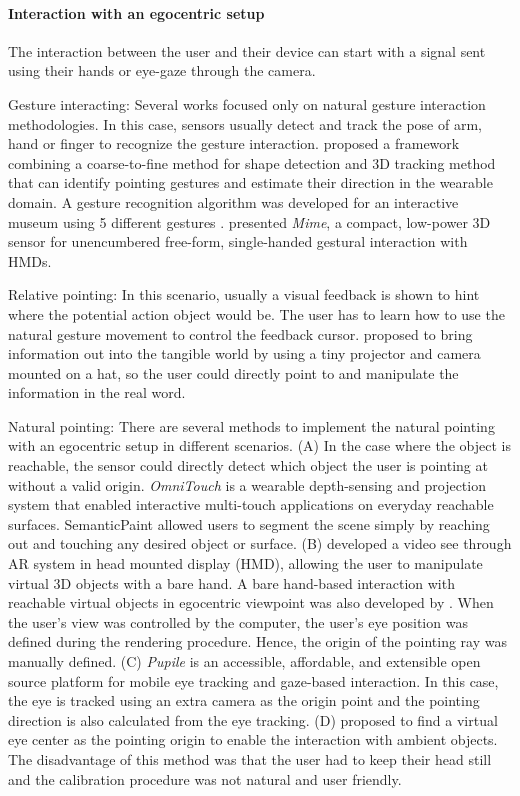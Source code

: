 \paragraph{Interaction with an egocentric setup} The interaction between the user and their device can start with a signal sent using their hands or eye-gaze through the camera.

Gesture interacting: Several works focused only on natural gesture interaction methodologies. In this case, sensors usually detect and track the pose of arm, hand or finger to recognize the gesture interaction.
\citet{DeCampos2006} proposed a framework combining a coarse-to-fine method for shape detection and 3D tracking method that can identify pointing gestures and estimate their direction in the wearable domain.
A gesture recognition algorithm was developed for an interactive museum using 5 different gestures \citep{Garcia-Rodriguez2011}. 
\citet{Colaco2013a} presented \textit{Mime}, a compact, low-power 3D sensor for unencumbered free-form, single-handed gestural interaction with HMDs. 

Relative pointing: In this scenario, usually a visual feedback is shown to hint where the potential action object would be. The user has to learn how to use the natural gesture movement to control the feedback cursor.
\citet{Mistry2009} proposed to bring information out into the tangible world by using a tiny projector and camera mounted on a hat, so the user could directly point to and manipulate the information in the real word.

Natural pointing: There are several methods to implement the natural pointing with an egocentric setup in different scenarios. 
(A) In the case where the object is reachable, the sensor could directly detect which object the user is pointing at without a valid origin. \textit{OmniTouch} \citep{Harrison2011} is a wearable depth-sensing and projection system that enabled interactive multi-touch applications on everyday reachable surfaces. 
SemanticPaint \citep{export:244725} allowed users to segment the scene simply by reaching out and touching any desired object or surface.
(B) \citet{Ha2014} developed a video see through AR system in head mounted display (HMD), allowing the user to manipulate virtual 3D objects with a bare hand. 
A bare hand-based interaction with reachable virtual objects in egocentric viewpoint was also developed by \citet{Jang2015}.
When the user's view was controlled by the computer, the user's eye position was defined during the rendering procedure. Hence, the origin of the pointing ray was manually defined.
(C) \textit{Pupile} \citep{Kassner2014} is an accessible, affordable, and extensible open source platform for mobile eye tracking and gaze-based interaction. In this case, the eye is tracked using an extra camera as the origin point and the pointing direction is also calculated from the eye tracking. 
(D) \citet{ma2015ismar} proposed to find a virtual eye center as the pointing origin to enable the interaction with ambient objects. The disadvantage of this method was that the user had to keep their head still and the calibration procedure was not natural and user friendly.

